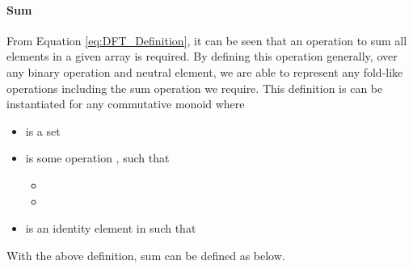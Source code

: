 \paragraph{Sum} From Equation \ref{eq:DFT_Definition}, it can be seen that
an operation to sum all elements in a given array is required.
By defining this operation generally, over any binary operation and neutral 
element, we are able to represent any fold-like operations including the sum
operation we require.
This definition is can be instantiated for any commutative monoid 
 where 
\begin{itemize}
  \item {} is a set
  \item {} is some operation , such that 
  \begin{itemize}
      \item {}
      \item {}
  \end{itemize}
  \item {} is an identity element in  such that 
\end{itemize}
With the above definition, sum can be defined as below.

